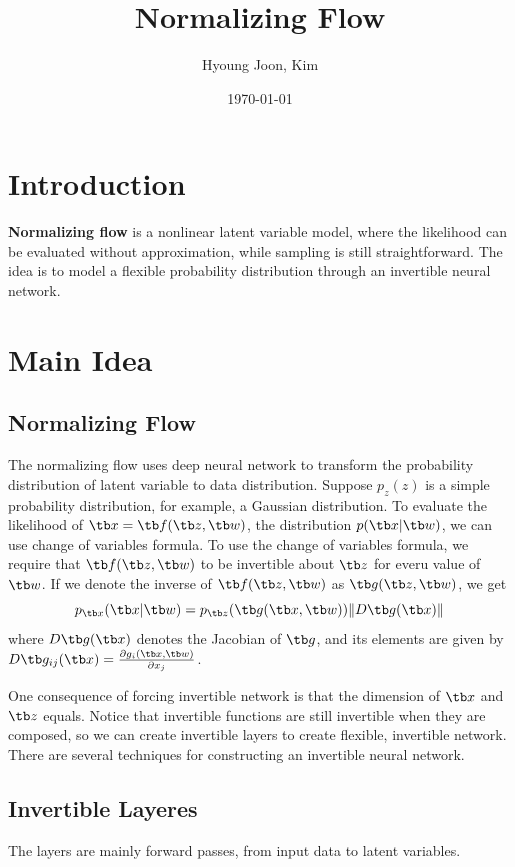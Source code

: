 \documentclass{article}
\title{Normalizing Flow}
\author{Hyoung Joon, Kim}
\date{\today}
\begin{document}
\maketitle
\tableofcontents
\newpage

\section{Introduction}
    \textbf{Normalizing flow} is a nonlinear latent variable model, where the likelihood can be evaluated without approximation,
    while sampling is still straightforward. The idea is to model a flexible probability distribution through an invertible neural network.
\section{Main Idea}
    \subsection{Normalizing Flow}
        The normalizing flow uses deep neural network to transform the probability distribution of latent variable to
        data distribution. Suppose $p_z(z)$ is a simple probability distribution, for example, a Gaussian distribution.
        To evaluate the likelihood of $\tb x = \tb f(\tb z,\tb w)$, the distribution $p(\tb x|\tb w)$, we can use
        change of variables formula. To use the change of variables formula, we require that $\tb f(\tb z,\tb w)$
        to be invertible about $\tb z$ for everu value of $\tb w$. If we denote the inverse of $\tb f(\tb z,\tb w)$
        as $\tb g(\tb z,\tb w)$, we get
        \[
        p_{\tb x}(\tb x|\tb w)=p_{\tb z}(\tb g(\tb x,\tb w))\|D\tb g(\tb x)\|
        \]
        where $D\tb g(\tb x)$ denotes the Jacobian of $\tb g$, and its elements are given by
        $D\tb g_{ij}(\tb x)=\frac{\partial g_i(\tb x,\tb w)}{\partial x_j}$.

        One consequence of forcing invertible network is that the dimension of $\tb x$ and $\tb z$ equals.
        Notice that invertible functions are still invertible when they are composed, so we can create invertible layers to create flexible, invertible network.
        There are several techniques for constructing an invertible neural network.
    
    \subsection{Invertible Layeres}
        The layers are mainly forward passes, from input data to latent variables.
\end{document}
